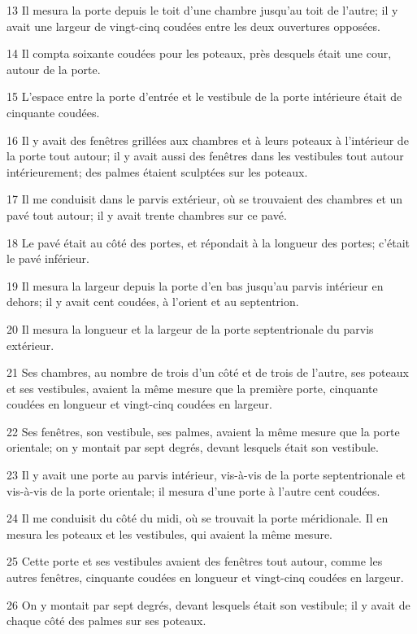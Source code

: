 \par 13 Il mesura la porte depuis le toit d'une chambre jusqu'au toit de l'autre; il y avait une largeur de vingt-cinq coudées entre les deux ouvertures opposées.
\par 14 Il compta soixante coudées pour les poteaux, près desquels était une cour, autour de la porte.
\par 15 L'espace entre la porte d'entrée et le vestibule de la porte intérieure était de cinquante coudées.
\par 16 Il y avait des fenêtres grillées aux chambres et à leurs poteaux à l'intérieur de la porte tout autour; il y avait aussi des fenêtres dans les vestibules tout autour intérieurement; des palmes étaient sculptées sur les poteaux.
\par 17 Il me conduisit dans le parvis extérieur, où se trouvaient des chambres et un pavé tout autour; il y avait trente chambres sur ce pavé.
\par 18 Le pavé était au côté des portes, et répondait à la longueur des portes; c'était le pavé inférieur.
\par 19 Il mesura la largeur depuis la porte d'en bas jusqu'au parvis intérieur en dehors; il y avait cent coudées, à l'orient et au septentrion.
\par 20 Il mesura la longueur et la largeur de la porte septentrionale du parvis extérieur.
\par 21 Ses chambres, au nombre de trois d'un côté et de trois de l'autre, ses poteaux et ses vestibules, avaient la même mesure que la première porte, cinquante coudées en longueur et vingt-cinq coudées en largeur.
\par 22 Ses fenêtres, son vestibule, ses palmes, avaient la même mesure que la porte orientale; on y montait par sept degrés, devant lesquels était son vestibule.
\par 23 Il y avait une porte au parvis intérieur, vis-à-vis de la porte septentrionale et vis-à-vis de la porte orientale; il mesura d'une porte à l'autre cent coudées.
\par 24 Il me conduisit du côté du midi, où se trouvait la porte méridionale. Il en mesura les poteaux et les vestibules, qui avaient la même mesure.
\par 25 Cette porte et ses vestibules avaient des fenêtres tout autour, comme les autres fenêtres, cinquante coudées en longueur et vingt-cinq coudées en largeur.
\par 26 On y montait par sept degrés, devant lesquels était son vestibule; il y avait de chaque côté des palmes sur ses poteaux.
